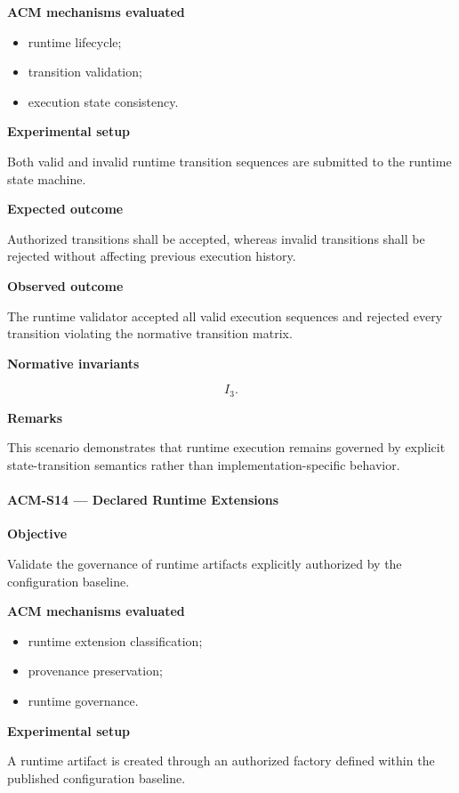 \documentclass[10pt]{article}
\begin{document}
\textbf{ACM mechanisms evaluated}

\begin{itemize}
    \item runtime lifecycle;
    \item transition validation;
    \item execution state consistency.
\end{itemize}

\textbf{Experimental setup}

Both valid and invalid runtime transition sequences are submitted to the
runtime state machine.

\textbf{Expected outcome}

Authorized transitions shall be accepted, whereas invalid transitions shall be
rejected without affecting previous execution history.

\textbf{Observed outcome}

The runtime validator accepted all valid execution sequences and rejected every
transition violating the normative transition matrix.

\textbf{Normative invariants}

\[
I_3.
\]

\textbf{Remarks}

This scenario demonstrates that runtime execution remains governed by explicit
state-transition semantics rather than implementation-specific behavior.

\paragraph{ACM-S14 --- Declared Runtime Extensions}

\textbf{Objective}

Validate the governance of runtime artifacts explicitly authorized by the
configuration baseline.

\textbf{ACM mechanisms evaluated}

\begin{itemize}
    \item runtime extension classification;
    \item provenance preservation;
    \item runtime governance.
\end{itemize}

\textbf{Experimental setup}

A runtime artifact is created through an authorized factory defined within the
published configuration baseline.
\end{document}
